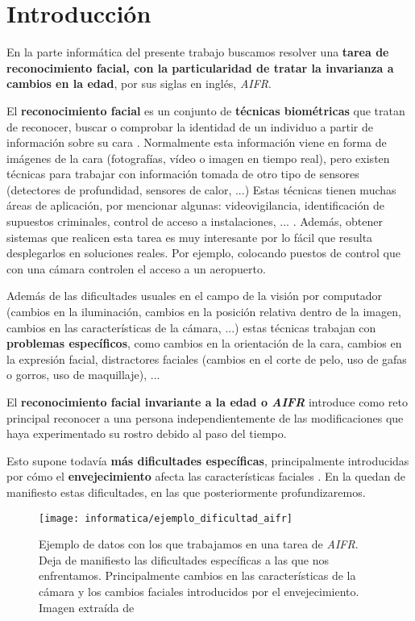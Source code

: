 \chapter{Introducción} \label{ich:introduccion}

En la parte informática del presente trabajo buscamos resolver una \textbf{tarea de reconocimiento facial, con la particularidad de tratar la invarianza a cambios en la edad}, por sus siglas en inglés, \textit{AIFR}.

El \textbf{reconocimiento facial} es un conjunto de \textbf{técnicas biométricas} que tratan de reconocer, buscar o comprobar  la identidad de un individuo a partir de información sobre su cara \cite{informatica:definicion_face_recognition}. Normalmente esta información viene en forma de imágenes de la cara (fotografías, vídeo o imagen en tiempo real), pero existen técnicas para trabajar con información tomada de otro tipo de sensores (detectores de profundidad, sensores de calor, ...) Estas técnicas tienen muchas áreas de aplicación, por mencionar algunas: videovigilancia, identificación de supuestos criminales, control de acceso a instalaciones, ... \cite{informatica:deep_fr_survey}. Además, obtener sistemas que realicen esta tarea es muy interesante por lo fácil que resulta desplegarlos en soluciones reales. Por ejemplo, colocando puestos de control que con una cámara controlen el acceso a un aeropuerto.

Además de las dificultades usuales en el campo de la visión por computador (cambios en la iluminación, cambios en la posición relativa dentro de la imagen, cambios en las características de la cámara, ...) estas técnicas trabajan con \textbf{problemas específicos}, como cambios en la orientación de la cara, cambios en la expresión facial, distractores faciales (cambios en el corte de pelo, uso de gafas o gorros, uso de maquillaje), ...

El \textbf{reconocimiento facial invariante a la edad o \textit{AIFR}} introduce como reto principal reconocer a una persona independientemente de las modificaciones que haya experimentado su rostro debido al paso del tiempo.

Esto supone todavía \textbf{más dificultades específicas}, principalmente introducidas por cómo el \textbf{envejecimiento} afecta las características faciales \cite{informatica:aifr_survey}. En la  quedan de manifiesto estas dificultades, en las que posteriormente profundizaremos.

\begin{figure}[h]
    \centering
    \texttt{[image: informatica/ejemplo\_dificultad\_aifr]}
    \caption{Ejemplo de datos con los que trabajamos en una tarea de \textit{AIFR}. Deja de manifiesto las dificultades específicas a las que nos enfrentamos. Principalmente cambios en las características de la cámara y los cambios faciales introducidos por el envejecimiento. Imagen extraída de \cite{informatica:aifr_survey}}
    \label{img:ejemplo_dificultad_aifr}
\end{figure}

